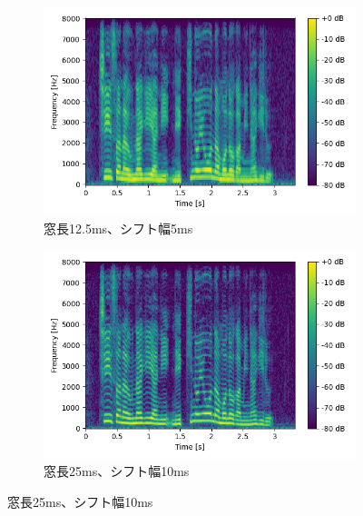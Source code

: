 \documentclass[12pt]{jarticle}
\numberwithin{equation}{section}    %
\numberwithin{figure}{section}      %
\numberwithin{table}{section}      %
\begin{document}
\begin{figure}[tb]
    \centering
    \begin{subfigure}[b]{0.48\textwidth}
        \centering
        \includegraphics[width=\textwidth]{./figure/sec2/spectrogram_1.png}
        \caption{窓長12.5ms、シフト幅5ms}
        \label{sec2:fig:spectrogram1}
    \end{subfigure}
    \begin{subfigure}[b]{0.48\textwidth}
        \centering
        \includegraphics[width=\textwidth]{./figure/sec2/spectrogram_2.png}
        \caption{窓長25ms、シフト幅10ms}
        \label{sec2:fig:spectrogram2}
    \end{subfigure}

    \vspace{0.5cm}


\end{figure}
\end{document}
